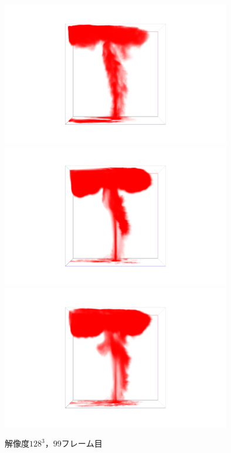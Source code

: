 \documentclass[a4j,12pt]{jreport}
\begin{document}

\begin{figure}[htbp]
\caption{$解像度128^3，99フレーム目$}
\label{fig:n128_f99}
\centering
\includegraphics[width=100mm]{images/n128_f99_truth.png}
\includegraphics[width=100mm]{images/n128_f99_dev1.png}
\includegraphics[width=100mm]{images/n128_f99_dev2.png}
\end{figure}
\end{document}
